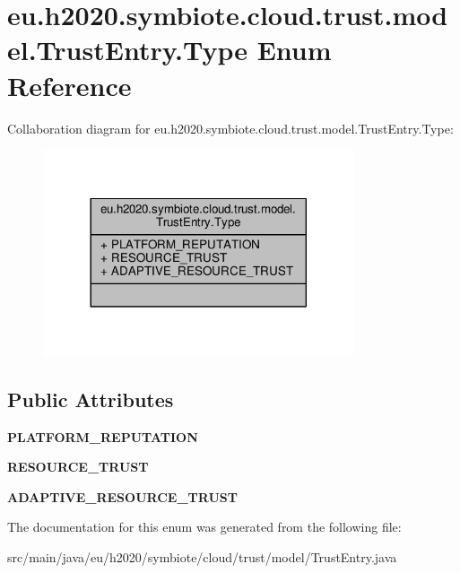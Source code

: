 \hypertarget{enumeu_1_1h2020_1_1symbiote_1_1cloud_1_1trust_1_1model_1_1TrustEntry_1_1Type}{}\section{eu.\+h2020.\+symbiote.\+cloud.\+trust.\+model.\+Trust\+Entry.\+Type Enum Reference}
\label{enumeu_1_1h2020_1_1symbiote_1_1cloud_1_1trust_1_1model_1_1TrustEntry_1_1Type}


Collaboration diagram for eu.\+h2020.\+symbiote.\+cloud.\+trust.\+model.\+Trust\+Entry.\+Type\+:\nopagebreak
\begin{figure}[H]
\begin{center}
\leavevmode
\includegraphics[width=260pt]{enumeu_1_1h2020_1_1symbiote_1_1cloud_1_1trust_1_1model_1_1TrustEntry_1_1Type__coll__graph}
\end{center}
\end{figure}
\subsection*{Public Attributes}
\begin{DoxyCompactItemize}
\item 
\mbox{\label{enumeu_1_1h2020_1_1symbiote_1_1cloud_1_1trust_1_1model_1_1TrustEntry_1_1Type_ab6714233e833e96190697f144b5d200f}} 
{\bfseries P\+L\+A\+T\+F\+O\+R\+M\+\_\+\+R\+E\+P\+U\+T\+A\+T\+I\+ON}
\item 
\mbox{\label{enumeu_1_1h2020_1_1symbiote_1_1cloud_1_1trust_1_1model_1_1TrustEntry_1_1Type_a290c9ed4f9655b404b0cc00e2bd5becd}} 
{\bfseries R\+E\+S\+O\+U\+R\+C\+E\+\_\+\+T\+R\+U\+ST}
\item 
\mbox{\label{enumeu_1_1h2020_1_1symbiote_1_1cloud_1_1trust_1_1model_1_1TrustEntry_1_1Type_a9e004d1e97acbd1e5cffe19abad391ec}} 
{\bfseries A\+D\+A\+P\+T\+I\+V\+E\+\_\+\+R\+E\+S\+O\+U\+R\+C\+E\+\_\+\+T\+R\+U\+ST}
\end{DoxyCompactItemize}


The documentation for this enum was generated from the following file\+:\begin{DoxyCompactItemize}
\item 
src/main/java/eu/h2020/symbiote/cloud/trust/model/Trust\+Entry.\+java\end{DoxyCompactItemize}
